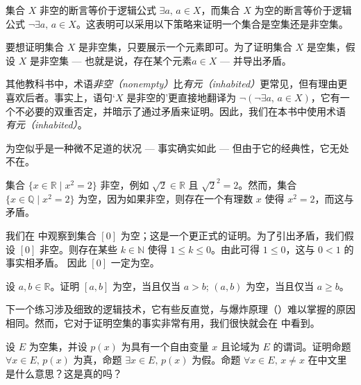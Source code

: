 集合 $X$ 非空的断言等价于逻辑公式 $\exists a,\, a \in X$，而集合 $X$ 为空的断言等价于逻辑公式 $\neg \exists a,\, a \in X$。这表明可以采用以下策略来证明一个集合是空集还是非空集。

\begin{strategy}[证明集合是空集还是非空集]
要想证明集合 $X$ 是非空集，只要展示一个元素即可。为了证明集合 $X$ 是空集，假设 $X$ 是非空集 --- 也就是说，存在某个元素$a \in X$ --- 并导出矛盾。
\end{strategy}

其他教科书中，术语\textit{非空（nonempty）}比\textit{有元（inhabited）}更常见，但有理由更喜欢后者。事实上，语句`$X$ 是非空的'更直接地翻译为 $\neg(\neg \exists a,\, a \in X)$，它有一个不必要的双重否定，并暗示了通过矛盾来证明。因此，我们在本书中使用术语 \textit{有元（inhabited）}。

为空似乎是一种微不足道的状况 --- 事实确实如此 --- 但由于它的经典性，它无处不在。

\begin{example}
集合 $\{ x \in \mathbb{R} \mid x^2 = 2 \}$ 非空，例如 $\sqrt{2} \in \mathbb{R}$ 且 $\sqrt{2} ^2 = 2$。然而，集合 $\{ x \in \mathbb{Q} \mid x^2 = 2 \}$ 为空，因为如果非空，则存在一个有理数 $x$ 使得 $x^2 = 2$，而这与  矛盾。
\end{example}

\begin{example}
我们在  中观察到集合 $[0]$ 为空；这是一个更正式的证明。为了引出矛盾，我们假设 $[0]$ 非空。则存在某些 $k \in \mathbb{N}$ 使得 $1 \le k \le 0$。由此可得 $1 \le 0$，这与 $0<1$ 的事实相矛盾。 因此 $[0]$ 一定为空。
\end{example}

\begin{exercise}
设 $a,b \in \mathbb{R}$。证明 $[a,b]$ 为空，当且仅当 $a > b$; $(a,b)$ 为空，当且仅当 $a \ge b$。
\end{exercise}

下一个练习涉及细致的逻辑技术，它有些反直觉，与爆炸原理（）难以掌握的原因相同。然而，它对于证明空集的事实非常有用，我们很快就会在  中看到。

\begin{exercise}
设 $E$ 为空集，并设 $p(x)$ 为具有一个自由变量 $x$ 且论域为 $E$ 的谓词。证明命题 $\forall x \in E,\, p(x)$ 为真，命题 $\exists x \in E,\, p(x)$ 为假。命题 $\forall x \in E,\, x \ne x$ 在中文里是什么意思？这是真的吗？
\end{exercise}

